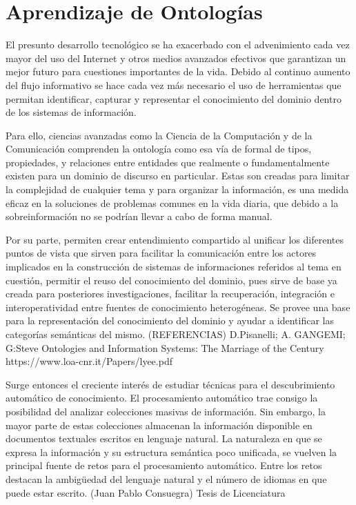 \chapter{Aprendizaje de Ontologías}\label{chapter:ontology-learning}
El presunto desarrollo tecnológico se ha exacerbado con el advenimiento cada vez mayor del uso del Internet y otros medios avanzados efectivos que garantizan un mejor futuro para cuestiones importantes de la vida. Debido al continuo aumento del flujo informativo se hace cada vez más necesario el uso de herramientas que permitan identificar, capturar y representar el conocimiento del dominio dentro de los sistemas de información.

Para ello, ciencias avanzadas como la Ciencia de la Computación y de la Comunicación comprenden la ontología como esa vía de formal de tipos, propiedades, y relaciones entre entidades que realmente o fundamentalmente existen para un dominio de discurso en particular. Estas son creadas para limitar la complejidad de cualquier tema y para organizar la información, es una medida eficaz en la soluciones de problemas comunes en la vida diaria, que debido a la sobreinformación no se podrían llevar a cabo de forma manual.

Por su parte, permiten crear entendimiento compartido al unificar los diferentes puntos de vista que sirven para facilitar la comunicación entre los actores implicados en la construcción de sistemas de informaciones referidos al tema en cuestión, permitir el reuso del conocimiento del dominio, pues sirve de base ya creada para posteriores investigaciones, facilitar la recuperación, integración e interoperatividad entre fuentes de conocimiento heterogéneas. Se provee una base para la representación del conocimiento del dominio y ayudar a identificar las categorías semánticas del mismo. (REFERENCIAS) D.Pisanelli; A. GANGEMI; G:Steve Ontologies and Information Systems: The Marriage of the Century https://www.loa-cnr.it/Papers/lyee.pdf

Surge entonces el creciente interés de estudiar técnicas para el descubrimiento automático de conocimiento. El procesamiento automático trae consigo la posibilidad del analizar colecciones masivas de información. Sin embargo, la mayor parte de estas colecciones almacenan la información disponible en documentos textuales escritos en lenguaje natural. La naturaleza en que se expresa la información y su estructura semántica poco unificada, se vuelven la principal fuente de retos para el procesamiento automático. Entre los retos destacan la ambigüedad del lenguaje natural y el número de idiomas en que puede estar escrito. (Juan Pablo Consuegra) Tesis de Licenciatura

